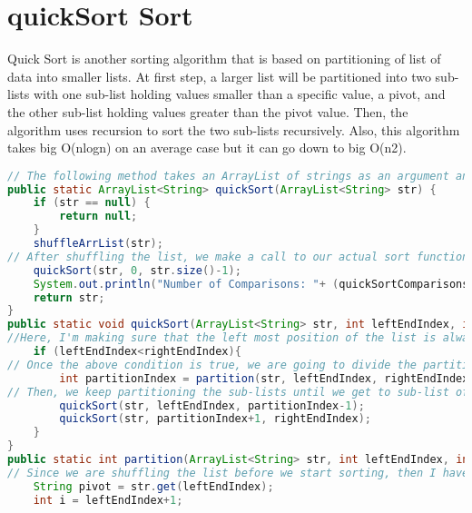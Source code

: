 \documentclass{article}
\begin{document}
\section{quickSort Sort}
Quick Sort is another sorting algorithm that is based on partitioning of list of data into smaller lists. At first step, a larger list will be partitioned into two sub-lists with one sub-list holding values smaller than a specific value, a pivot, and the other sub-list holding values greater than the pivot value. Then, the algorithm uses recursion to sort the two sub-lists recursively. Also, this algorithm takes big O(nlogn) on an average case but it can go down to big O(n2). 
\begin{lstlisting}[language=Java]
// The following method takes an ArrayList of strings as an argument and I'm using it to make an easy call to the actual quick sort function. 
public static ArrayList<String> quickSort(ArrayList<String> str) {
    if (str == null) {
        return null;
    }
    shuffleArrList(str);
// After shuffling the list, we make a call to our actual sort function and pass three arguments as the ArrayList of strings, position of the first element of the list, and the position of the last element of the Arraylist respectively.
    quickSort(str, 0, str.size()-1);
    System.out.println("Number of Comparisons: "+ (quickSortComparisonsCount));
    return str;
}
public static void quickSort(ArrayList<String> str, int leftEndIndex, int rightEndIndex) {
//Here, I'm making sure that the left most position of the list is always less than right most position, if not then we know that we have partitioned all the elements of the list. 
    if (leftEndIndex<rightEndIndex){
// Once the above condition is true, we are going to divide the partition the larger Arraylist around a specific value. To do that we are making a call to the partition function which will return the position of the specific value that we partitioned around the elements. 
        int partitionIndex = partition(str, leftEndIndex, rightEndIndex);
// Then, we keep partitioning the sub-lists until we get to sub-list of one element.
        quickSort(str, leftEndIndex, partitionIndex-1);
        quickSort(str, partitionIndex+1, rightEndIndex);
    }
}
public static int partition(ArrayList<String> str, int leftEndIndex, int rightEndIndex) {
// Since we are shuffling the list before we start sorting, then I have decided to pick the first element of the ArrayList as the pivot and store it in a string variable called pivot. 
    String pivot = str.get(leftEndIndex);
    int i = leftEndIndex+1;

\end{lstlisting}
\end{document}
